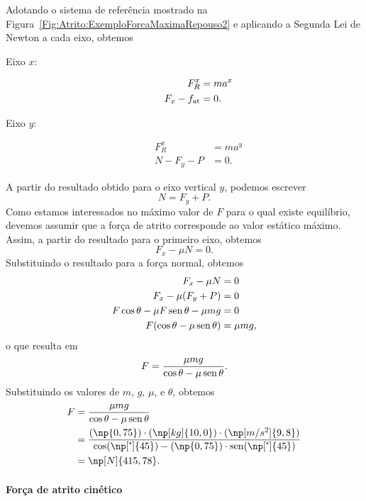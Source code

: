 Adotando o sistema de referência mostrado na Figura~\ref{Fig:Atrito:ExemploForcaMaximaRepouso2} e aplicando a Segunda Lei de Newton a cada eixo, obtemos
\begin{description}
    \item[Eixo $x$:]
        \begin{align}
            F_R^x &= m a^x \\
            F_x - f_{\rm{at}} &= 0.
        \end{align}
    \item[Eixo $y$:]
        \begin{align}
            F_R^x &= m a^y \\
            N - F_y - P &= 0.
        \end{align}
\end{description}
%
A partir do resultado obtido para o eixo vertical $y$, podemos escrever
\begin{equation}
    N = F_y + P.
\end{equation}
%
Como estamos interessados no máximo valor de $F$ para o qual existe equilíbrio, devemos assumir que a força de atrito corresponde ao valor estático máximo. Assim, a partir do resultado para o primeiro eixo, obtemos
\begin{equation}
    F_x - \mu N = 0.
\end{equation}
%
Substituindo o resultado para a força normal, obtemos
\begin{align}
    F_x - \mu N &= 0 \\
    F_x - \mu (F_y + P) &= 0 \\
    F\cos\theta - \mu F\operatorname{sen}\theta - \mu mg &= 0 \\
    F(\cos\theta - \mu\operatorname{sen}\theta) &= \mu mg,
\end{align}
%
o que resulta em
\begin{equation}
    F = \frac{\mu mg}{\cos\theta - \mu\operatorname{sen}\theta}.
\end{equation}
%
Substituindo os valores de $m$, $g$, $\mu$, e $\theta$, obtemos
\begin{align}
    F &= \frac{\mu mg}{\cos\theta - \mu\sen\theta} \\
    &= \frac{(\np{0,75}) \cdot (\np[kg]{10,0}) \cdot (\np[m/s^2]{9,8})}{\cos(\np[\tcdegree]{45}) - (\np{0,75}) \cdot \sen (\np[\tcdegree]{45})} \\
    &= \np[N]{415,78}.
\end{align}

\paragraph{Força de atrito cinético} 

